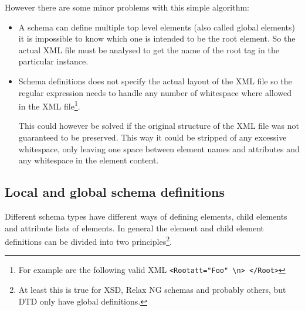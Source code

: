 \documentclass[a4paper, oneside]{memoir}
\theoremstyle{definition}
\begin{document}
  However there are some minor problems with this simple algorithm:

  \begin{itemize}
  \item A schema can define multiple top level elements (also called global
    elements) it is impossible to know which one is intended to be the root
    element. So the actual XML file must be analysed to get the name of the root
    tag in the particular instance.

  \item Schema definitions does not specify the actual layout of the XML file so
    the regular expression needs to handle any number of whitespace where
    allowed in the XML file\footnote{For example are the following valid XML
      \texttt{<Root{\textvisiblespace}att="Foo"\textvisiblespace%
        \textvisiblespace\textbackslash{n}\textvisiblespace>\textvisiblespace%
        </Root\textvisiblespace\textvisiblespace>}}.

    This could however be solved if the original structure of the XML file was
    not guaranteed to be preserved. This way it could be stripped of any
    excessive whitespace, only leaving one space between element names and
    attributes and any whitespace in the element content.
  \end{itemize}

\subsection{Local and global schema definitions}
\label{sec:local-global-schema-definitions}
Different schema types have different ways of defining elements, child elements
and attribute lists of elements. In general the element and child element
definitions can be divided into two principles\footnote{At least this is true
  for XSD, Relax NG schemas and probably others, but DTD only have global
  definitions.}.
\end{document}
